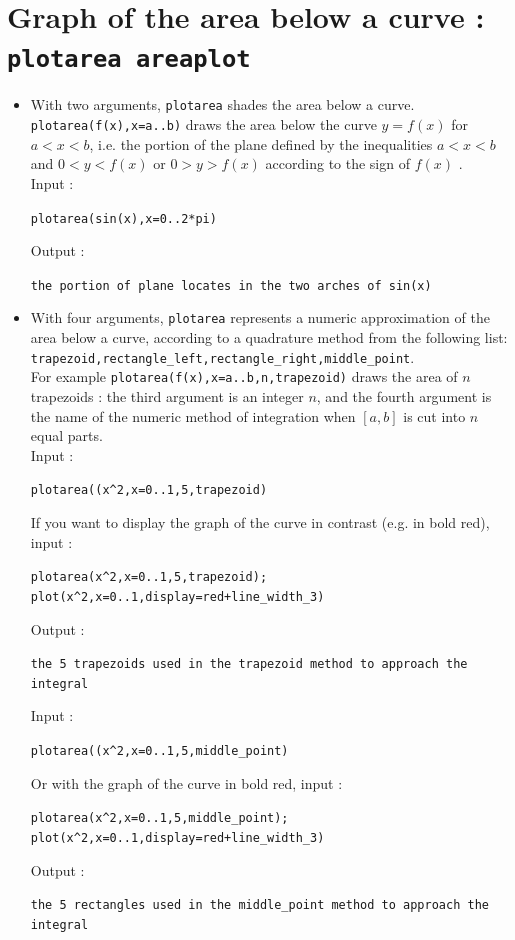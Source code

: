 \documentclass[a4paper,11pt]{book}
\begin{document}
\section{Graph of the area below a curve : {\tt plotarea areaplot}}
\begin{itemize}
\item With two arguments, {\tt plotarea} shades the area below a curve.\\ 
{\tt plotarea(f(x),x=a..b)} draws the area below the curve $y=f(x)$ for 
$a<x<b$, i.e. the portion of the plane defined by the inequalities $a<x<b$ and
$0<y<f(x)$ or $0>y>f(x)$ according to the sign of $f(x)$ .\\
Input :
\begin{center}{\tt plotarea(sin(x),x=0..2*pi)}\end{center}
Output :
\begin{center}{\tt the portion of plane locates in the two arches of sin(x)}\end{center}
\item With four arguments, {\tt plotarea}  represents a numeric approximation
of the area below a curve, according to a quadrature method from the
following list:\\
{\tt trapezoid,rectangle\_left,rectangle\_right,middle\_point}.\\
For example {\tt plotarea(f(x),x=a..b,n,trapezoid)} 
draws the area of $n$ trapezoids : the 
third argument is an integer $n$, and the fourth argument is the name of the 
numeric method of integration when $[a,b]$ is cut into $n$ equal parts.\\
Input :
\begin{center}{\tt plotarea((x\verb|^|2,x=0..1,5,trapezoid)}\end{center}
If you want to display the graph of the curve in contrast
(e.g. in bold red), input :
\begin{center}{\tt plotarea(x\verb|^|2,x=0..1,5,trapezoid); 
plot(x\verb|^|2,x=0..1,display=red+line\_width\_3)}\end{center}
Output :
\begin{center}{\tt the 5 trapezoids used in the trapezoid method to approach the integral}\end{center}
Input :
\begin{center}{\tt plotarea((x\verb|^|2,x=0..1,5,middle\_point)}\end{center}
Or with the graph of the curve in bold red, input :
\begin{center}{\tt plotarea(x\verb|^|2,x=0..1,5,middle\_point); plot(x\verb|^|2,x=0..1,display=red+line\_width\_3)}\end{center}
Output :
\begin{center}{\tt the 5 rectangles used in the middle\_point method
    to approach the integral}\end{center}
\end{itemize}
\end{document}
